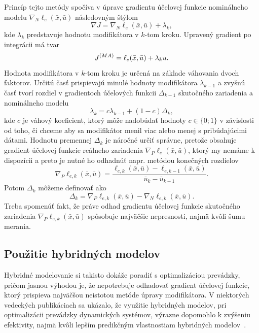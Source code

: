 Princíp tejto metódy spočíva v úprave gradientu účelovej funkcie nominálneho modelu $ \nabla_N\ell_e(\bar{x},\bar{u}) $ následovným štýlom
\begin{equation}
	\nabla J = \nabla_N\ell_e(\bar{x},\bar{u}) + \lambda_k,
\end{equation}
kde $ \lambda_k $ predstavuje hodnotu modifikátora v $ k $-tom kroku. Upravený gradient po integrácii má tvar 
\begin{equation}
	J^{\tiny{(MA)}} = \ell_e(\bar{x},\bar{u}) + \lambda_ku.
\end{equation}
Hodnota modifikátora v $ k $-tom kroku je určená na základe váhovania dvoch faktorov. Určitú časť prispievajú minulé hodnoty modifikátora $ \lambda_{k-1} $ a zvyšnú časť tvorí rozdiel v gradientoch účelových funkcii $ \Delta_{k-1} $ skutočného zariadenia a nominálneho modelu 
\begin{equation}
	\label{eq:mas_weight}
	\lambda_k = c\lambda_{k-1} + \left(1 - c\right)\Delta_{k},
\end{equation}
kde $ c $ je váhový koeficient, ktorý môže nadobúdať hodnoty $ c \in \lbrace 0; 1 \rbrace $ v závislosti od toho, či chceme aby sa modifikátor menil viac alebo menej s pribúdajúcimi dátami.
Hodnotu premennej $ \Delta_k $ je náročné určiť správne, pretože obsahuje gradient účelovej funkcie reálneho zariadenia $ \nabla_P\ell_e(\bar{x},\bar{u}) $, ktorý my nemáme k dispozícii a preto je nutné ho odhadnúť napr. metódou konečných rozdielov
\begin{equation}
	\nabla_P\ell_{e,k}(\bar{x},\bar{u}) = \frac{\ell_{e,k}(\bar{x},\bar{u}) - \ell_{e,k-1}(\bar{x},\bar{u})}{\bar{u}_k - \bar{u}_{k-1}}.
\end{equation} 
Potom $ \Delta_k $ môžeme definovať ako 
\begin{equation}
	\label{eq:mas_correction}
	\Delta_k = \nabla_P\ell_{e,k}(\bar{x},\bar{u}) - \nabla_N\ell_{e,k}(\bar{x},\bar{u}).
\end{equation}
Treba spomenúť fakt, že práve odhad gradientu účelovej funkcie skutočného zariadenia $ \nabla_P\ell_{e,k}(\bar{x},\bar{u}) $ spôsobuje najväčšie nepresnosti, najmä kvôli šumu merania. 

\subsection{Použitie hybridných modelov}
Hybridné modelovanie si takisto dokáže poradiť s optimalizáciou prevádzky, pričom jasnou výhodou je, že nepotrebuje odhadovať gradient účelovej funkcie, ktorý prispieva najväčšou neistotou metóde úpravy modifikátora. V niektorých vedeckých publikáciach sa ukázalo, že využitie hybridných modelov, pri optimalizácii prevádzky dynamických systémov, výrazne dopomohlo k zvýšeniu efektivity, najmä kvôli lepším predikčným vlastnostiam hybridných modelov~\cite{bhutani:hybrid_modelling_opt:2006}. 

